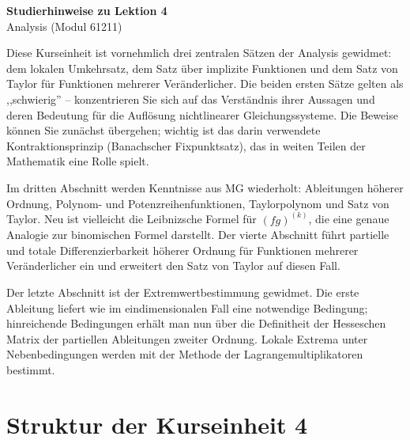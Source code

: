 \documentclass[a4paper,12pt]{article}
\begin{document}
\begin{center}
  {\LARGE\bfseries Studierhinweise zu Lektion 4}\\[0.5em]
  {\large Analysis (Modul 61211)}
\end{center}

\vspace{1em}

Diese Kurseinheit ist vornehmlich drei zentralen Sätzen der Analysis gewidmet:
dem lokalen Umkehrsatz, dem Satz über implizite Funktionen und dem Satz von
Taylor für Funktionen mehrerer Veränderlicher. Die beiden ersten Sätze gelten
als ,,schwierig'' -- konzentrieren Sie sich auf das Verständnis ihrer Aussagen
und deren Bedeutung für die Auflösung nichtlinearer Gleichungssysteme. Die
Beweise können Sie zunächst übergehen; wichtig ist das darin verwendete
Kontraktionsprinzip (Banachscher Fixpunktsatz), das in weiten Teilen der
Mathematik eine Rolle spielt.

Im dritten Abschnitt werden Kenntnisse aus MG wiederholt: Ableitungen höherer
Ordnung, Polynom- und Potenzreihenfunktionen, Taylorpolynom und Satz von
Taylor. Neu ist vielleicht die Leibnizsche Formel für $(fg)^{(k)}$, die eine
genaue Analogie zur binomischen Formel darstellt. Der vierte Abschnitt führt
partielle und totale Differenzierbarkeit höherer Ordnung für Funktionen
mehrerer Veränderlicher ein und erweitert den Satz von Taylor auf diesen Fall.

Der letzte Abschnitt ist der Extremwertbestimmung gewidmet. Die erste
Ableitung liefert wie im eindimensionalen Fall eine notwendige Bedingung;
hinreichende Bedingungen erhält man nun über die Definitheit der Hesseschen
Matrix der partiellen Ableitungen zweiter Ordnung. Lokale Extrema unter
Nebenbedingungen werden mit der Methode der Lagrangemultiplikatoren bestimmt.

\section*{Struktur der Kurseinheit 4}
\end{document}
